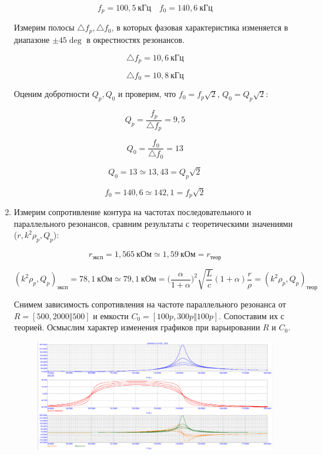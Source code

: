 \documentclass[a4paper, 12pt]{article}%
\begin{document}
\begin{enumerate}
\[f_p = 100,5 \: \textit{кГц} \quad f_0 = 140,6 \: \textit{кГц}\]

Измерим полосы $\triangle f_p, \triangle f_0$, в которых фазовая характеристика изменяется в диапазоне $\pm 45 \deg$ в окрестностях резонансов.

\[\triangle f_p = 10,6 \: \textit{кГц}\]

\[\triangle f_0 = 10,8 \: \textit{кГц}\]

Оценим добротности $Q_p, Q_0$ и проверим, что $f_0 = f_p \sqrt{2}$, $Q_0 = Q_p \sqrt{2}$:

\[Q_p = \frac{f_p}{\triangle f_p} = 9,5\]

\[Q_0 = \frac{f_0}{\triangle f_0} = 13\]

\[Q_0 = 13 \simeq 13,43 = Q_p \sqrt{2}\]

\[f_0 = 140,6 \simeq 142,1 = f_p \sqrt{2}\]

\item Измерим сопротивление контура на частотах последовательного и параллельного резонансов, сравним результаты с теоретическими значениями ($r, k^2\rho_p, Q_p$):

\[r_{\textit{эксп}} = 1,565 \: \textit{кОм} \simeq 1,59 \: \textit{кОм} = r_{\textit{теор}}\]

\[(k^2\rho_p, Q_p)_{\textit{эксп}} = 78,1 \: \textit{кОм} \simeq  79,1 \: \textit{кОм} = \Big(\frac{\alpha}{1 + \alpha}\Big)^2 \sqrt{\frac{L}{c}}(1 + \alpha)\frac{r}{\rho} = (k^2\rho_p, Q_p)_{\textit{теор}}\]

Снимем зависимость сопротивления на частоте параллельного резонанса от $R = [500, 2000 \Vert 500]$ и емкости $C_0 = [100p, 300p \Vert 100p]$. Сопоставим их с теорией. Осмыслим характер изменения графиков при варьировании $R$ и $C_0$.

\begin{figure}[h!]
\centering
\includegraphics[scale=0.4]{combined_AC2.png}
\label{fig:Image1}
\end{figure}


\end{enumerate}
\end{document}
